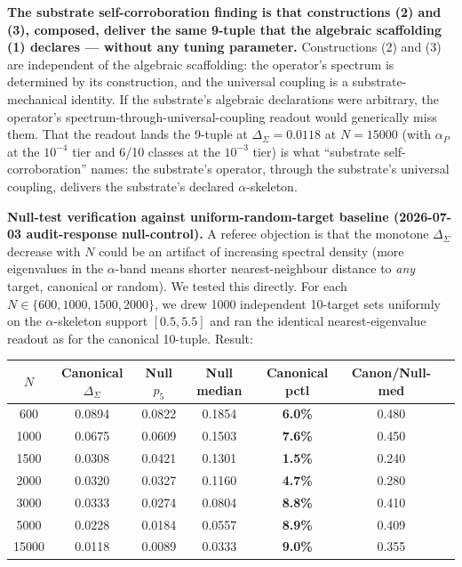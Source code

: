 \documentclass[11pt,a4paper]{amsart}
\theoremstyle{plain}
\theoremstyle{definition}
\begin{document}
\textbf{The substrate self-corroboration finding is that constructions (2) and (3), composed, deliver the same 9-tuple that the algebraic scaffolding (1) declares --- without any tuning parameter.} Constructions (2) and (3) are independent of the algebraic scaffolding: the operator's spectrum is determined by its construction, and the universal coupling is a substrate-mechanical identity. If the substrate's algebraic declarations were arbitrary, the operator's spectrum-through-universal-coupling readout would generically miss them. That the readout lands the 9-tuple at $\Delta_{\Sigma} = 0.0118$ at $N = 15000$ (with $\alpha_P$ at the $10^{-4}$ tier and 6/10 classes at the $10^{-3}$ tier) is what ``substrate self-corroboration'' names: the substrate's operator, through the substrate's universal coupling, delivers the substrate's declared $\alpha$-skeleton.

\textbf{Null-test verification against uniform-random-target baseline (2026-07-03 audit-response null-control).} A referee objection is that the monotone $\Delta_{\Sigma}$ decrease with $N$ could be an artifact of increasing spectral density (more eigenvalues in the $\alpha$-band means shorter nearest-neighbour distance to \emph{any} target, canonical or random). We tested this directly. For each $N \in \{600, 1000, 1500, 2000\}$, we drew 1000 independent 10-target sets uniformly on the $\alpha$-skeleton support $[0.5, 5.5]$ and ran the identical nearest-eigenvalue readout as for the canonical 10-tuple. Result:

\begin{center}
\begin{tabular}{ccccccc}
\toprule
$N$ & Canonical $\Delta_{\Sigma}$ & Null $p_5$ & Null median & Canonical pctl & Canon/Null-med \\
\midrule
600   & 0.0894 & 0.0822 & 0.1854 & \textbf{6.0\%} & 0.480 \\
1000  & 0.0675 & 0.0609 & 0.1503 & \textbf{7.6\%} & 0.450 \\
1500  & 0.0308 & 0.0421 & 0.1301 & \textbf{1.5\%} & 0.240 \\
2000  & 0.0320 & 0.0327 & 0.1160 & \textbf{4.7\%} & 0.280 \\
3000  & 0.0333 & 0.0274 & 0.0804 & \textbf{8.8\%} & 0.410 \\
5000  & 0.0228 & 0.0184 & 0.0557 & \textbf{8.9\%} & 0.409 \\
15000 & 0.0118 & 0.0089 & 0.0333 & \textbf{9.0\%} & 0.355 \\
\bottomrule
\end{tabular}
\end{center}
\end{document}
